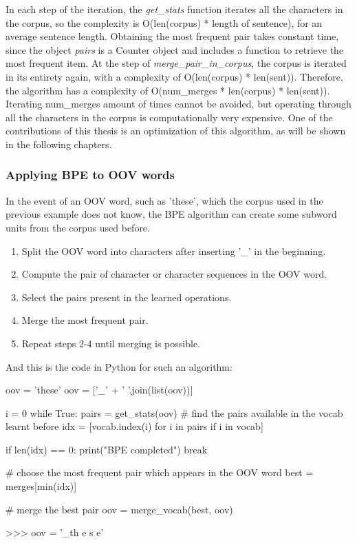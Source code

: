 In each step of the iteration, the \emph{get\_stats} function iterates all the characters in the corpus, so the complexity is O(len(corpus) * length of sentence), for an average sentence length. Obtaining the most frequent pair takes constant time, since the object \emph{pairs} is a Counter object and includes a function to retrieve the most frequent item. At the step of \emph{merge\_pair\_in\_corpus}, the corpus is iterated in its entirety again, with a complexity of O(len(corpus) * len(sent)). Therefore, the algorithm has a complexity of O(num\_merges * len(corpus) * len(sent)). Iterating num\_merges amount of times cannot be avoided, but operating through all the characters in the corpus is computationally very expensive. One of the contributions of this thesis is an optimization of this algorithm, as will be shown in the following chapters.

\subsubsection{Applying BPE to OOV words}

In the event of an OOV word, such as 'these', which the corpus used in the previous example does not know, the BPE algorithm can create some subword units from the corpus used before.

\begin{enumerate}
    \item Split the OOV word into characters after inserting '\_' in the beginning.
    \item Compute the pair of character or character sequences in the OOV word.
    \item Select the pairs present in the learned operations.
    \item Merge the most frequent pair.
    \item Repeat steps 2-4 until merging is possible.
\end{enumerate}

And this is the code in Python for such an algorithm:

\begin{python}
oov = 'these'
oov = ['_' + ' '.join(list(oov))]

i = 0
while True:
  pairs = get_stats(oov)
  # find the pairs available in the vocab learnt before
  idx = [vocab.index(i) for i in pairs if i in vocab]

  if len(idx) == 0:
    print("BPE completed")
    break

  # choose the most frequent pair which appears in the OOV word
  best = merges[min(idx)]

  # merge the best pair
  oov = merge_vocab(best, oov)

>>> oov = '_th e s e'
\end{python}

